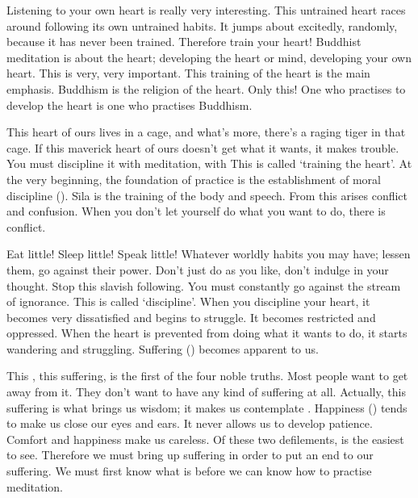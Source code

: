Listening to your own heart is really very interesting. This untrained heart races around following its own untrained habits. It jumps about excitedly, randomly, because it has never been trained. Therefore train your heart! Buddhist meditation is about the heart; developing the heart or mind, developing your own heart. This is very, very important. This training of the heart is the main emphasis. Buddhism is the religion of the heart. Only this! One who practises to develop the heart is one who practises Buddhism. 

This heart of ours lives in a cage, and what's more, there's a raging tiger in that cage. If this maverick heart of ours doesn't get what it wants, it makes trouble. You must discipline it with meditation, with  This is called `training the heart'. At the very beginning, the foundation of practice is the establishment of moral discipline (). S\={\i}la is the training of the body and speech. From this arises conflict and confusion. When you don't let yourself do what you want to do, there is conflict. 

Eat little! Sleep little! Speak little! Whatever worldly habits you may have; lessen them, go against their power. Don't just do as you like, don't indulge in your thought. Stop this slavish following. You must constantly go against the stream of ignorance. This is called `discipline'. When you discipline your heart, it becomes very dissatisfied and begins to struggle. It becomes restricted and oppressed. When the heart is prevented from doing what it wants to do, it starts wandering and struggling. Suffering () becomes apparent to us. 

This , this suffering, is the first of the four noble truths. Most people want to get away from it. They don't want to have any kind of suffering at all. Actually, this suffering is what brings us wisdom; it makes us contemplate . Happiness () tends to make us close our eyes and ears. It never allows us to develop patience. Comfort and happiness make us careless. Of these two defilements,  is the easiest to see. Therefore we must bring up suffering in order to put an end to our suffering. We must first know what  is before we can know how to practise meditation. 

